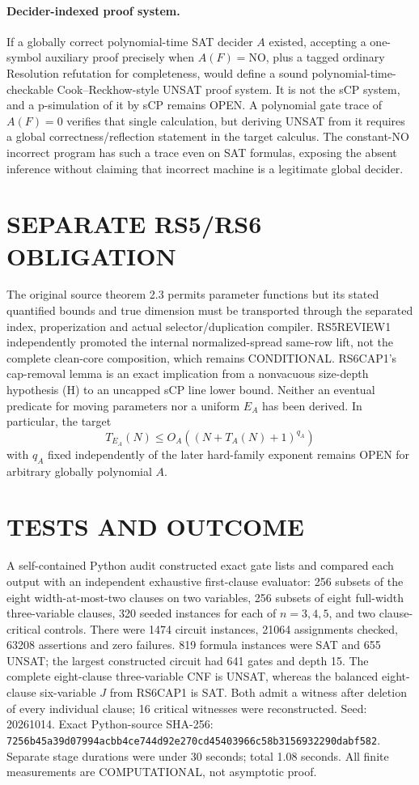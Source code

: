 \documentclass[11pt]{article}
\begin{document}
\paragraph{Decider-indexed proof system.}
If a globally correct polynomial-time SAT decider \(A\) existed,
accepting a one-symbol auxiliary proof precisely when
\(A(F)=\mathrm{NO}\), plus a tagged ordinary Resolution refutation
for completeness, would define a sound polynomial-time-checkable
Cook--Reckhow-style UNSAT proof system. It is not the sCP system,
and a p-simulation of it by sCP remains OPEN. A polynomial gate
trace of \(A(F)=0\) verifies that single calculation, but deriving
UNSAT from it requires a global correctness/reflection statement
in the target calculus. The constant-NO incorrect program has such
a trace even on SAT formulas, exposing the absent inference without
claiming that incorrect machine is a legitimate global decider.

\section{SEPARATE RS5/RS6 OBLIGATION}
The original source theorem 2.3 permits parameter functions but its
stated quantified bounds and true dimension must be transported
through the separated index, properization and actual
selector/duplication compiler. RS5REVIEW1 independently promoted
the internal normalized-spread same-row lift, not the complete
clean-core composition, which remains CONDITIONAL.
RS6CAP1's cap-removal lemma is an exact implication from a
nonvacuous size-depth hypothesis (H) to an uncapped sCP line
lower bound. Neither an eventual predicate for moving parameters
nor a uniform \(E_A\) has been derived. In particular, the target
\[
T_{E_A}(N)\le O_A((N+T_A(N)+1)^{q_A})
\]
with \(q_A\) fixed independently of the later hard-family exponent
remains OPEN for arbitrary globally polynomial \(A\).

\section{TESTS AND OUTCOME}
A self-contained Python audit constructed exact gate lists and
compared each output with an independent exhaustive first-clause
evaluator: 256 subsets of the eight width-at-most-two clauses
on two variables, 256 subsets of eight full-width three-variable
clauses, 320 seeded instances for each of \(n=3,4,5\),
and two clause-critical controls. There were 1474 circuit instances,
21064 assignments checked, 63208 assertions and zero failures.
819 formula instances were SAT and 655 UNSAT; the largest
constructed circuit had 641 gates and depth 15.
The complete eight-clause three-variable CNF is UNSAT, whereas
the balanced eight-clause six-variable \(J\) from RS6CAP1 is SAT.
Both admit a witness after deletion of every individual clause;
16 critical witnesses were reconstructed.
Seed: 20261014. Exact Python-source SHA-256:
\texttt{7256b45a39d07994acbb4ce744d92e270cd45403966c58b3156932290dabf582}.
Separate stage durations were under 30 seconds; total 1.08 seconds.
All finite measurements are COMPUTATIONAL, not asymptotic proof.
\end{document}
